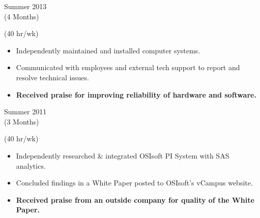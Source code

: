 
\flushleft \begin{minipage}[t]{\dateColWidth}
Summer 2013 \\
(4 Months)
\end{minipage}
\begin{minipage}[t]{0.8\textwidth}
 (40 hr/wk) \\[-1 em]
\begin{adjustwidth}{2.5 em}{0 em}

\begin{itemize} \itemsep-2pt
\setlength{\itemindent}{-2 em}

\item Independently maintained and installed computer systems.
\item Communicated with employees and external tech support to report and resolve technical issues.
\item\textbf{Received praise for improving reliability of hardware and software.}

\end{itemize}
\end{adjustwidth}
\end{minipage}

\divLine

\flushleft \begin{minipage}[t]{\dateColWidth}
Summer 2011 \\
(3 Months)
\end{minipage}
\begin{minipage}[t]{0.8\textwidth}
 (40 hr/wk) \\[-1 em]
\begin{adjustwidth}{2.5 em}{0 em} 

\begin{itemize} \itemsep-2pt
\setlength{\itemindent}{-2 em}

\item Independently researched \& integrated OSIsoft PI System with SAS analytics.
\item Concluded findings in a White Paper posted to OSIsoft's vCampus website.
\item\textbf{Received praise from an outside company for quality of the White Paper.}
\end{itemize}

\end{adjustwidth}
\end{minipage}